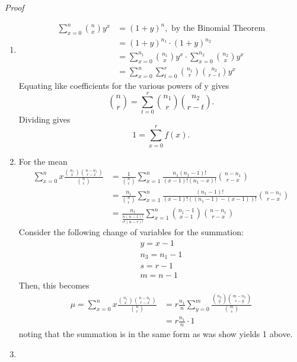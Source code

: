 \documentclass[10pt,]{book}
\makeatletter
\renewcommand*{\proofname}{Proof}
\renewenvironment{proof}[1][\proofname]{\par
  \pushQED{\qed}%
  \normalfont \topsep6\p@\@plus6\p@\relax
  \trivlist
  \item\relax
    {\itshape
    #1\@addpunct{.}}\hspace\labelsep\ignorespaces
}{%
  \popQED\endtrivlist\@endpefalse
}
\numberwithin{equation}{section}
\makeatother
\begin{document}
\begin{proof}\hypertarget{proof-39}{}
\hypertarget{p-846}{}%
\leavevmode%
\begin{enumerate}
\item\hypertarget{li-223}{}\hypertarget{p-847}{}%
%
\begin{align*}
\sum_{x=0}^n \binom{n}{x} y^x & = (1+y)^n, \text{ by the Binomial Theorem}\\
& = (1+y)^{n_1} \cdot (1+y)^{n_2} \\
& = \sum_{x=0}^{n_1} \binom{n_1}{x} y^x \cdot \sum_{x=0}^{n_2} \binom{n_2}{x} y^x \\
& = \sum_{x=0}^n \sum_{t=0}^r \binom{n_1}{r} \binom{n_2}{r-t} y^x
\end{align*}
Equating like coefficients for the various powers of y gives%
\begin{equation*}
\binom{n}{r} = \sum_{t=0}^r \binom{n_1}{r} \binom{n_2}{r-t}.
\end{equation*}
Dividing gives%
\begin{equation*}
1 = \sum_{x=0}^r f(x).
\end{equation*}
%
\item\hypertarget{li-224}{}\hypertarget{p-848}{}%
For the mean%
\begin{align*}
\sum_{x=0}^n x \frac{\binom{n_1}{x} \binom{n-n_1}{r-x}}{\binom{n}{r}} & = 
\frac{1}{\binom{n}{r}} \sum_{x=1}^n  \frac{n_1(n_1-1)!}{(x-1)!(n_1-x)!}  \binom{n-n_1}{r-x}				\\
& = \frac{n_1}{\binom{n}{r}} \sum_{x=1}^n  \frac{(n_1-1)!}{(x-1)!((n_1-1)-(x-1))!}  \binom{n-n_1}{r-x} \\
& = \frac{n_1}{\frac{n(n-1)!}{r!(n-r)!}} \sum_{x=1}^n  \binom{n_1-1}{x-1}  \binom{n-n_1}{r-x} 
\end{align*}
Consider the following change of variables for the summation:%
\begin{gather*}
y = x-1\\
n_3 = n_1-1\\
s = r-1\\
m = n-1
\end{gather*}
Then, this becomes%
\begin{align*}
\mu = \sum_{x=0}^n x \frac{\binom{n_1}{x} \binom{n-n_1}{r-x}}{\binom{n}{r}} & = r \frac{n_1}{n} \sum_{y=0}^m  \frac{\binom{n_3}{y} \binom{m-n_3}{s-y}}{\binom{m}{s}}\\
& = r \frac{n_1}{n} \cdot 1
\end{align*}
noting that the summation is in the same form as was show yields 1 above.%
\item\hypertarget{li-225}{}\hypertarget{p-849}{}%

\end{enumerate}
\end{proof}
\end{document}
